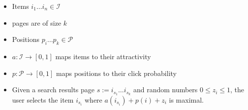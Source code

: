 \documentclass{beamer}
\begin{document}
\begin{frame}
\begin{itemize}
  \item Items $i_1 \ldots i_n \in \mathcal{I}$
  \item pages are of size $k$
  \item Positions $p_i \ldots p_k \in \mathcal{P}$

  \item 
    
    $a : \mathcal{I} \rightarrow [0,1]$ maps items to their attractivity

  \item 
  
    $p : \mathcal{P} \rightarrow [0,1]$ maps positions to their click
    probability

  \item 
    
    Given a search results page $s := i_{s_1} \ldots i_{s_k}$ and random
    numbers $0 \leq z_i \leq 1$, the user selects the item $i_{s_i}$ where
    $a(i_{s_i}) + p(i) + z_i$ is maximal.

\end{itemize}
\end{frame}
\end{document}
